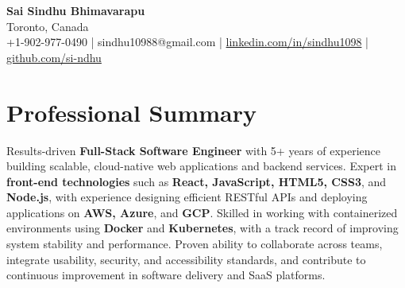 \documentclass[letterpaper,11pt]{article}
\begin{document}
\begin{center}
  {\Large \textbf{Sai Sindhu Bhimavarapu}} \\
  Toronto, Canada \\
  +1-902-977-0490 \enspace | \enspace sindhu10988@gmail.com \enspace | \enspace \href{https://www.linkedin.com/in/sindhu1098/}{linkedin.com/in/sindhu1098} \enspace | \enspace \href{https://github.com/si-ndhu}{github.com/si-ndhu}
\end{center}

\section{Professional Summary}
  \begin{itemize}[leftmargin=0.15in, label={}]
    \small{\item{
     Results-driven \textbf{Full-Stack Software Engineer} with 5+ years of experience building scalable, cloud-native web applications and backend services. Expert in \textbf{front-end technologies} such as \textbf{React, JavaScript, HTML5, CSS3}, and \textbf{Node.js}, with experience designing efficient RESTful APIs and deploying applications on \textbf{AWS, Azure}, and \textbf{GCP}. Skilled in working with containerized environments using \textbf{Docker} and \textbf{Kubernetes}, with a track record of improving system stability and performance. Proven ability to collaborate across teams, integrate usability, security, and accessibility standards, and contribute to continuous improvement in software delivery and SaaS platforms.
    }}
  \end{itemize}
\vspace{-16pt}

\end{document}
